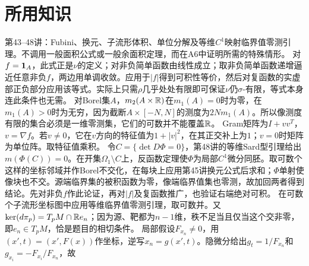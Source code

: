 \documentclass[UTF8,fontset=fandol,11pt]{ctexart}
\begin{document}
\section*{所用知识}
第43--48讲：Fubini、换元、子流形体积、单位分解及等维$C^1$映射临界值零测引理。不调用一般面积公式或一般余面积定理，而在A6中证明所需的特殊情形。
对$f=\mathbf1_A$，此式正是$\nu$的定义；对非负简单函数由线性成立；取非负简单函数递增逼近任意非负$f$，两边用单调收敛。应用于$|f|$得到可积性等价，然后对复函数的实虚部正负部分应用该等式。实际上只需$\rho$几乎处处有限即可保证$\nu$仍$\sigma$-有限，等式本身连此条件也无需。
对Borel集$A$，$m_2(A\times\mathbb R)$在$m_1(A)=0$时为零，在$m_1(A)>0$时为无穷，因为截断$A\times[-N,N]$的测度为$2Nm_1(A)$。所以像测度有限的集合必须是一维零测集，它们的可数并不能覆盖$\mathbb R$。
Gram矩阵为$I+vv^T$，$v=\nabla f$。若$v\ne0$，它在$v$方向的特征值为$1+|v|^2$，在其正交补上为$1$；$v=0$时矩阵为单位阵。取特征值乘积。
令$C=\{\det D\Phi=0\}$，第48讲的等维Sard型引理给出$m(\Phi(C))=0$。在开集$\Omega_1\setminus C$上，反函数定理使$\Phi$为局部$C^1$微分同胚。取可数个这样的坐标邻域并作Borel不交化，在每块上应用第45讲换元公式后求和；$\Phi$单射使像块也不交。源端临界集的被积函数为零，像端临界值集也零测，故加回两者得到结论。先对非负$f$作此论证，再对$|f|$及复函数推广，也验证右端绝对可积。
在可数个子流形坐标图中应用等维临界值零测引理，取可数并。又$\ker(d\pi_p)=T_pM\cap\mathbb R e_n$；因为源、靶都为$n-1$维，秩不足当且仅当这个交非零，即$e_n\in T_pM$，恰是题目的相切条件。
局部假设$F_{x_n}\ne0$，用$(x',t)=(x',F(x))$作坐标，逆写$x_n=g(x',t)$。隐微分给出$g_t=1/F_{x_n}$和$g_{x_i}=-F_{x_i}/F_{x_n}$，故
\end{document}
